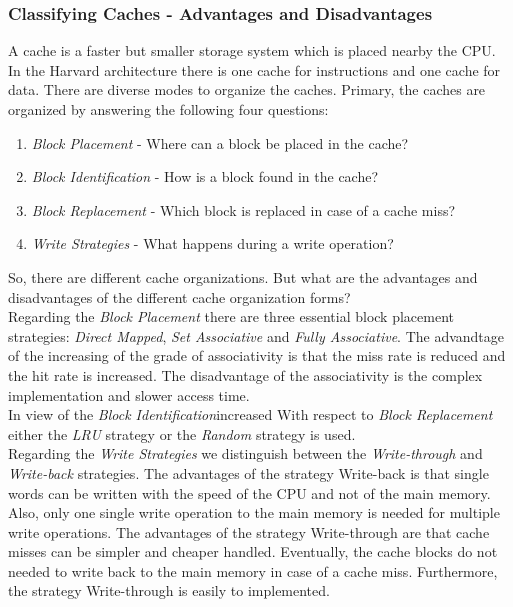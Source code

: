 \subsubsection{Classifying Caches - Advantages and Disadvantages}
\label{sec:classifyingCaches}
A cache is a faster but smaller storage system which is placed nearby the CPU. In the Harvard architecture there is one cache for instructions and one cache for data. There are diverse modes to organize the caches. Primary, the caches are organized by answering the following four questions:
\begin{enumerate}
	\item \textit{Block Placement} - Where can a block be placed in the cache?
	\item \textit{Block Identification} - How is a block found in the cache?
	\item \textit{Block Replacement} - Which block is replaced in case of a cache miss?
	\item \textit{Write Strategies} - What happens during a write operation?
\end{enumerate}
So, there are different cache organizations. But what are the advantages and disadvantages of the different cache organization forms?\\
Regarding the \textit{Block Placement} there are three essential block placement strategies: \textit{Direct Mapped}, \textit{Set Associative} and \textit{Fully Associative}. The advandtage of the increasing of the grade of associativity is that the miss rate is reduced and the hit rate is increased. The disadvantage of the associativity is the complex implementation and slower access time.\\
In view of the \textit{Block Identification}increased
With respect to \textit{Block Replacement} either the \textit{LRU} strategy or the \textit{Random} strategy is used.\\ 
Regarding the \textit{Write Strategies} we distinguish between the \textit{Write-through} and \textit{Write-back} strategies. The advantages of the strategy Write-back is that single words can be written with the speed of the CPU and not of the main memory. Also, only one single write operation to the main memory is needed for multiple write operations. The advantages of the strategy Write-through are that cache misses can be simpler and cheaper handled. Eventually, the cache blocks do not needed to write back to the main memory in case of a cache miss. Furthermore, the strategy Write-through is easily to implemented.



